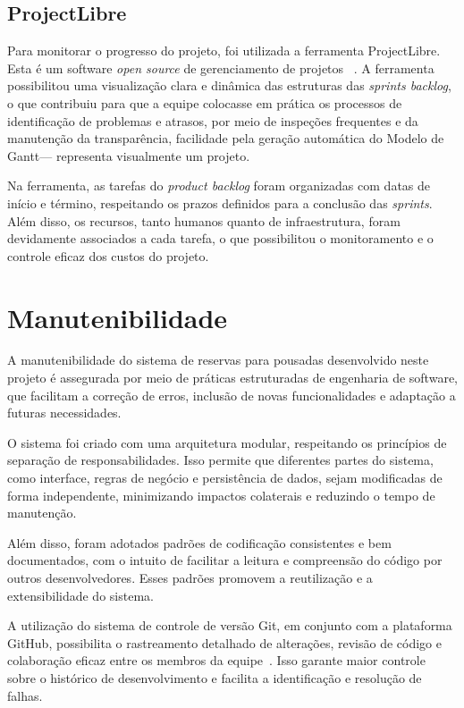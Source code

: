 \documentclass[
	12pt,				%
	openany,			%
	oneside,			%
	a4paper,			%
	english,			%
	french,				%
	spanish,			%
	brazil				%
	]{abntex2}
\begin{document}
\subsection{ProjectLibre}
Para monitorar o progresso do projeto, foi utilizada a ferramenta  ProjectLibre. Esta é um software \textit{open source} de gerenciamento de projetos ~\cite{projectlibre}. A ferramenta possibilitou uma visualização clara e dinâmica das estruturas das \textit{sprints backlog}, o que contribuiu para que a equipe colocasse em prática os processos de identificação de problemas e atrasos, por meio de inspeções frequentes e da manutenção da transparência, facilidade pela geração automática do Modelo de Gantt— representa visualmente um projeto.

Na ferramenta, as tarefas do \textit{product backlog} foram organizadas com datas de início e término, respeitando os prazos definidos para a conclusão das \textit{sprints}. Além disso, os recursos, tanto humanos quanto de infraestrutura, foram devidamente associados a cada tarefa, o que possibilitou o monitoramento e o controle eficaz dos custos do projeto.

\section{Manutenibilidade}
A manutenibilidade do sistema de reservas para pousadas desenvolvido neste projeto é assegurada por meio de práticas estruturadas de engenharia de software, que facilitam a correção de erros, inclusão de novas funcionalidades e adaptação a futuras necessidades.

O sistema foi criado com uma arquitetura modular, respeitando os princípios de separação de responsabilidades. Isso permite que diferentes partes do sistema, como interface, regras de negócio e persistência de dados, sejam modificadas de forma independente, minimizando impactos colaterais e reduzindo o tempo de manutenção.

Além disso, foram adotados padrões de codificação consistentes e bem documentados, com o intuito de facilitar a leitura e compreensão do código por outros desenvolvedores. Esses padrões promovem a reutilização e a extensibilidade do sistema.

A utilização do sistema de controle de versão Git, em conjunto com a plataforma GitHub, possibilita o rastreamento detalhado de alterações, revisão de código e colaboração eficaz entre os membros da equipe~\cite{github-doc}. Isso garante maior controle sobre o histórico de desenvolvimento e facilita a identificação e resolução de falhas.
\end{document}

